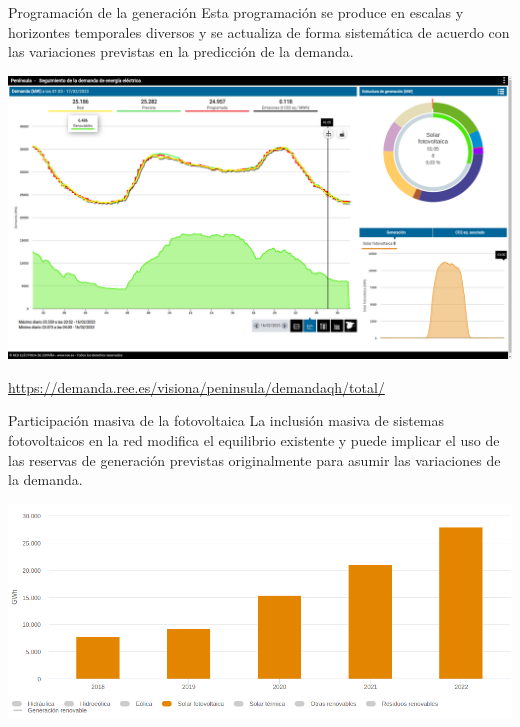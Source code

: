 \documentclass[aspectratio=169, usenames,svgnames,dvipsnames]{beamer}
\begin{document}
\begin{frame}[label={sec:orgf081406}]{Programación de la generación}
Esta programación se produce en \alert{escalas y horizontes temporales diversos} y se \alert{actualiza de forma sistemática} de acuerdo con las variaciones previstas en la predicción de la demanda.

\begin{center}
\includegraphics[height=0.6\textheight]{../figs/CurvaDemandaREE.png}
\end{center}

\begin{center}
\url{https://demanda.ree.es/visiona/peninsula/demandaqh/total/}
\end{center}
\end{frame}


\begin{frame}[label={sec:orge597626}]{Participación masiva de la fotovoltaica}
La \alert{inclusión masiva} de sistemas fotovoltaicos en la red \alert{modifica el
equilibrio} existente y puede implicar el uso de las reservas de
generación previstas originalmente para asumir las variaciones de la
demanda.

\begin{center}
\includegraphics[height=0.6\textheight]{../figs/EvolucionGeneracionFV_REE.png}
\end{center}
\end{frame}
\end{document}
